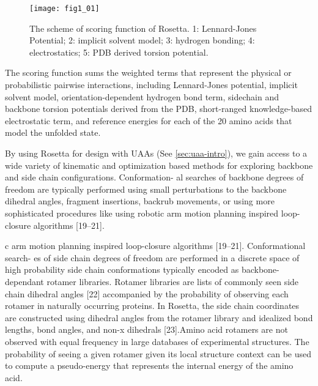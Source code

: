 \begin{refsection}
\begin{figure}[h!] \centering \texttt{[image: fig1\_01]}
    \caption[The scheme of scoring function of Rosetta. 1: Lennard-Jones
    Potential; 2: implicit solvent model; 3: hydrogen bonding; 4:
electrostatics; 5: PDB drived torsion potential.]{The scheme of scoring
    function of Rosetta. 1: Lennard-Jones Potential; 2: implicit solvent model;
3: hydrogen bonding; 4: electrostatics; 5: PDB derived torsion potential.}
\label{fig:rosetta-intro}
\end{figure}

The scoring function sums the weighted terms that represent the physical or
probabilistic pairwise interactions\cite{Rohl2004}, including Lennard-Jones
potential, implicit solvent model\cite{Lazaridis1999}, orientation-dependent
hydrogen bond term\cite{Kortemme2003}, sidechain and backbone torsion
potentials derived from the PDB, short-ranged knowledge-based electrostatic
term, and reference energies for each of the 20 amino acids that model the
unfolded state.

By using Rosetta for design with UAAs (See \ref{sec:uaa-intro}), we gain access to a
wide variety of kinematic and optimization based methods for exploring backbone
and side chain configurations. Conformation- al searches of backbone degrees of
freedom are typically performed using small perturbations to the backbone
dihedral angles, fragment insertions, backrub movements, or using more
sophisticated procedures like using robotic arm motion planning inspired
loop-closure algorithms [19–21].

c arm motion planning inspired loop-closure algorithms [19–21]. Conformational
search- es of side chain degrees of freedom are performed in a discrete space
of high probability side chain conformations typically encoded as
backbone-dependant rotamer libraries. Rotamer libraries are lists of commonly
seen side chain dihedral angles [22] accompanied by the probability of
observing each rotamer in naturally occurring proteins. In Rosetta, the side
chain coordinates are constructed using dihedral angles from the rotamer
library and idealized bond lengths, bond angles, and non-x dihedrals [23].Amino
acid rotamers are not observed with equal frequency in large databases of
experimental structures. The probability of seeing a given rotamer given its
local structure context can be used to compute a pseudo-energy that represents
the internal energy of the amino acid.


\end{refsection}
